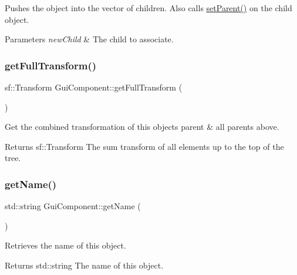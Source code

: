 Pushes the object into the vector of children. Also calls \mbox{\hyperlink{class_gui_component_a526481fb2424c1ea771e78be27a091f9}{set\+Parent()}} on the child object. 


\begin{DoxyParams}{Parameters}
{\em new\+Child} & The child to associate. \\
\hline
\end{DoxyParams}
\mbox{\label{class_gui_component_a9402e70432502a9b8187365a95839a05}} 
\subsubsection{\texorpdfstring{get\+Full\+Transform()}{getFullTransform()}}
{\footnotesize\ttfamily sf\+::\+Transform Gui\+Component\+::get\+Full\+Transform (\begin{DoxyParamCaption}{ }\end{DoxyParamCaption})}



Get the combined transformation of this object\textquotesingle{}s parent \& all parents above. 

\begin{DoxyReturn}{Returns}
sf\+::\+Transform The sum transform of all elements up to the top of the tree. 
\end{DoxyReturn}
\mbox{\label{class_gui_component_a521f21d8ae5369fe255a1209fcd3bd0f}} 
\subsubsection{\texorpdfstring{get\+Name()}{getName()}}
{\footnotesize\ttfamily std\+::string Gui\+Component\+::get\+Name (\begin{DoxyParamCaption}{ }\end{DoxyParamCaption})}



Retrieves the name of this object. 

\begin{DoxyReturn}{Returns}
std\+::string The name of this object. 
\end{DoxyReturn}
\mbox{\label{class_gui_component_aba1969f731ef56396a1e69e50ff1f8fb}} 

